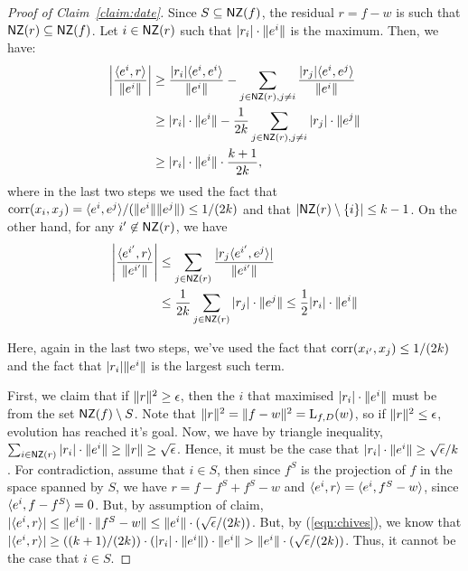 \begin{proof}[Proof of Claim~\ref{claim:date}] Since $S \subseteq \mathsf{NZ}(f)$, the
residual $r = f - w$ is such that $\mathsf{NZ}(r) \subseteq \mathsf{NZ}(f)$. Let $i \in \mathsf{NZ}(r)$
such that $|r_i|\cdot \Vert e^i \Vert$ is the maximum. Then, we have:
\begin{align}
\left|\frac{\langle e^i, r \rangle}{\Vert e^i \Vert} \right| &\geq
\frac{|r_i|\langle e^i, e^i \rangle}{\Vert e^i \Vert} - \sum_{j \in \mathsf{NZ}(r), j \neq i}
\frac{|r_j|\langle e^i, e^j \rangle}{\Vert e^i \Vert} \nonumber  \\
&\geq |r_i|\cdot \Vert e^i \Vert - \frac{1}{2k} \sum_{j \in \mathsf{NZ}(r), j \neq i}
|r_j| \cdot \Vert e^j \Vert \label{eqn:chives} \\
&\geq |r_i| \cdot \Vert e^i \Vert \cdot \frac{k+1}{2k}, \nonumber
\end{align}
where in the last two steps we used the fact that $\mathrm{corr}(x_i, x_j) =
\langle e^i, e^j \rangle/(\Vert e^i \Vert \Vert e^j \Vert) \leq 1/(2k)$ and that $|\mathsf{NZ}(r)
\setminus \{ i \}| \leq k-1$. On the other hand, for any $i^\prime \not\in
\mathsf{NZ}(r)$, we have
\begin{align}
\left| \frac{\langle e^{i^\prime}, r \rangle}{\Vert e^{i^\prime} \Vert} \right| &\leq
\sum_{j \in \mathsf{NZ}(r)} \frac{|r_j\langle e^{i^\prime}, e^j \rangle|}{\Vert e^{i^\prime} \Vert}
\nonumber \\
&\leq \frac{1}{2k} \sum_{j \in \mathsf{NZ}(r)} |r_j| \cdot \Vert e^j \Vert \leq \frac{1}{2}
|r_i| \cdot \Vert e^i \Vert \label{eqn:dill}
\end{align}

Here, again in the last two steps, we've used the fact that $\mathrm{corr}(x_{i^\prime},
x_j) \leq 1/(2k)$ and the fact that $|r_i| \Vert e^i \Vert$ is the largest such
term. 

First, we claim that if $\Vert r \Vert^2 \geq \epsilon$, then the $i$ that
maximised $|r_i| \cdot \Vert e^i \Vert$ must be from the set $\mathsf{NZ}(f) \setminus
S$. Note that $\Vert r \Vert^2 = \Vert f - w \Vert^2 = \mathrm{L}_{f, D}(w)$, so if
$\Vert r \Vert^2 \leq \epsilon$, evolution has reached it's goal. Now, we have by
triangle inequality, $\sum_{i \in \mathsf{NZ}(r)} |r_i| \cdot \Vert e^i \Vert \geq
\Vert r \Vert \geq \sqrt{\epsilon}$. Hence, it must be the case that $|r_i| \cdot
\Vert e^i \Vert \geq \sqrt{\epsilon}/{k}$. For contradiction, assume that $i \in
S$, then since $f^S$ is the projection of $f$ in the space spanned by $S$, we
have $r = f - f^S + f^S - w$ and $\langle e^i, r \rangle = \langle e^i, f^S - w \rangle$, since
$\langle e^i, f - f^S \rangle = 0$. But, by assumption of claim, $|\langle e^i, r \rangle|\leq
\Vert e^i \Vert \cdot \Vert f^S - w \Vert \leq \Vert e^i \Vert \cdot
(\sqrt{\epsilon}/(2k))$. But, by (\ref{eqn:chives}), we know that $|\langle e^i, r \rangle|
\geq ((k+1)/(2k)) \cdot (|r_i| \cdot \Vert e^i \Vert) \cdot \Vert e^i \Vert >
\Vert e^i \Vert \cdot(\sqrt{\epsilon}/(2k))$.  Thus, it cannot be the case that
$i \in S$. 


\end{proof}
